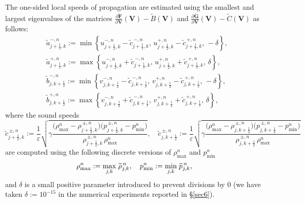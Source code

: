 \documentclass[preprint,12pt]{elsarticle}
\newcommand{\kph}{{k+\frac{1}{2}}}
\newcommand{\jph}{{j+\frac{1}{2}}}
\newcommand{\mF}{\bm{F}}
\newcommand{\mG}{\bm{G}}
\newcommand{\ve}{\varepsilon}
\newcommand*\xbar[1]{%
	\hbox{%
		\vbox{%
			\hrule height 0.5pt %
			\kern0.4ex%
			\hbox{%
				\kern-0.05em%
				\ensuremath{#1}%
				\kern-0.00em%
			}%
		}%
	}%
}
\begin{document}
The one-sided local speeds of propagation are estimated using the smallest and largest eigenvalues of the matrices
$\frac{\partial\widetilde{\mF}}{\partial\bm V}(\bm V)-\widetilde B(\bm V)$ and
$\frac{\partial\widetilde{\mG}}{\partial\bm V}(\bm V)-\widetilde C(\bm V)$ as follows:
\begin{equation}
	\begin{aligned}
		&\tilde a^{-,n}_{\jph,k}:=\min\left\{u^{-,n}_{\jph,k}-\tilde c^{\,-,n}_{\jph,k},\,u^{+,n}_{\jph,k}-\tilde c^{\,+,n}_{\jph,k},\,-\delta
		\right\},\\
		&\tilde a^{+,n}_{\jph,k}:=\max\left\{u^{-,n}_{\jph,k}+\tilde c^{\,-,n}_{\jph,k},\,u^{+,n}_{\jph,k}+\tilde c^{\,+,n}_{\jph,k},\,
		\delta\right\},\\
		&\tilde b^{-,n}_{j,\kph}:=\min\left\{v^{-,n}_{j,\kph}-\tilde c^{\,-,n}_{j,\kph},\,v^{+,n}_{j,\kph}-\tilde c^{\,+,n}_{j,\kph},\,
		-\delta\right\},\\
		&\tilde b^{+,n}_{j,\kph}:=\max\left\{v^{-,n}_{j,\kph}+\tilde c^{\,-,n}_{j,\kph},\,v^{+,n}_{j,\kph}+\tilde c^{\,+,n}_{j,\kph},\,
		\delta\right\},
	\end{aligned}
	\label{4.49}
\end{equation}
where the sound speeds
$$
\tilde c^{\,\pm,n}_{\jph,k}:=\frac{1}{\ve}\sqrt{\gamma\frac{\big(\rho_{\max}^n-\rho^{\,\pm,n}_{\jph,k}\big)
		\big(p^{\,\pm,n}_{\jph,k}-p_{\min}^n)}{\rho^{\,\pm,n}_{\jph,k}\,\rho_{\max}^n}},\quad
\tilde c^{\,\pm,n}_{j,\kph}:=\frac{1}{\ve}\sqrt{\gamma\frac{\big(\rho_{\max}^n-\rho^{\,\pm,n}_{j,\kph}\big)
		\big(p^{\,\pm,n}_{j,\kph}-p_{\min}^n)}{\rho^{\,\pm,n}_{j,\kph}\,\rho_{\max}^n}}
$$
are computed using the following discrete versions of $\rho_{\max}^n$ and $p_{\min}^n$
\begin{equation}
	\rho_{\max}^n:=\max\limits_{j,k}\,\xbar{\rho}_{j,k}^{\,n},\quad p_{\min}^n:=\min\limits_{j,k}\,\xbar p_{j,k}^{\,n},
	\label{3.35}
\end{equation}
and $\delta$ is a small positive parameter introduced to prevent divisions by $0$ (we have taken $\delta:=10^{-15}$ in the numerical
experiments reported in \S\ref{sec6}).
\end{document}
